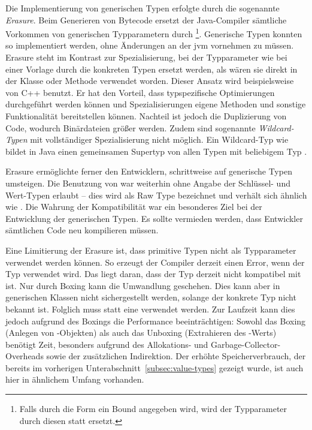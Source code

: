 Die Implementierung von generischen Typen erfolgte durch die sogenannte \emph{Erasure}.
Beim Generieren von Bytecode ersetzt der Java-Compiler sämtliche Vorkommen von generischen Typparametern durch \footnote{Falls durch die Form  ein Bound angegeben wird, wird der Typparameter durch diesen statt  ersetzt.}.
Generische Typen konnten so implementiert werden, ohne Änderungen an der \ac{jvm} vornehmen zu müssen.
Erasure steht im Kontrast zur Spezialisierung, bei der Typparameter wie bei einer Vorlage durch die konkreten Typen ersetzt werden, als wären sie direkt in der Klasse oder Methode verwendet worden.
Dieser Ansatz wird beispielsweise von C++ benutzt.
Er hat den Vorteil, dass typspezifische Optimierungen durchgeführt werden können und Spezialisierungen eigene Methoden und sonstige Funktionalität bereitstellen können.
Nachteil ist jedoch die Duplizierung von Code, wodurch Binärdateien größer werden.
Zudem sind sogenannte \emph{Wildcard-Typen} mit vollständiger Spezialisierung nicht möglich.
Ein Wildcard-Typ wie  bildet in Java einen gemeinsamen Supertyp von allen Typen  mit beliebigem Typ .

Erasure ermöglichte ferner den Entwicklern, schrittweise auf generische Typen umsteigen.
Die Benutzung von  war weiterhin ohne Angabe der Schlüssel- und Wert-Typen erlaubt -- dies wird als Raw Type bezeichnet und verhält sich ähnlich wie .
Die Wahrung der Kompatibilität war ein besonderes Ziel bei der Entwicklung der generischen Typen.
Es sollte vermieden werden, dass Entwickler sämtlichen Code neu kompilieren müssen.

Eine Limitierung der Erasure ist, dass primitive Typen nicht als Typparameter verwendet werden können.
So erzeugt der Compiler derzeit einen Error, wenn der Typ  verwendet wird.
Das liegt daran, dass der Typ  derzeit nicht kompatibel mit  ist.
Nur durch Boxing kann die Umwandlung  geschehen.
Dies kann aber in generischen Klassen nicht sichergestellt werden, solange der konkrete Typ nicht bekannt ist.
Folglich muss statt  eine  verwendet werden.
Zur Laufzeit kann dies jedoch aufgrund des Boxings die Performance beeinträchtigen:
Sowohl das Boxing (Anlegen von -Objekten) als auch das Unboxing (Extrahieren des -Werts) benötigt Zeit, besonders aufgrund des Allokations- und Garbage-Collector-Overheads sowie der zusätzlichen Indirektion.
Der erhöhte Speicherverbrauch, der bereits im vorherigen Unterabschnitt~\ref{subsec:value-types} gezeigt wurde, ist auch hier in ähnlichem Umfang vorhanden.

